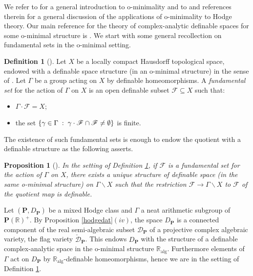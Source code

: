 \documentclass[10pt]{article}
\numberwithin{equation}{subsection}
\theoremstyle{plain}
\newtheorem{proposition}[theorem]{Proposition}
\theoremstyle{definition}
\newtheorem{definition}[theorem]{Definition}
\theoremstyle{remark}
\newcommand{\alg}{\mathbb{R}_\mathrm{alg}}
\newcommand{\R}{\mathbb R}
\newcommand{\pp}{\mathbf P}
\newcommand{\quo}{\backslash}
\begin{document}
We refer to \cite{vdd} for a general introduction to o-minimality and to \cite{klingicm} and references therein for a general discussion of the applications of o-minimality to Hodge theory. Our main reference for the theory of complex-analytic definable spaces for some o-minimal structure is \cite{bbt}. We start with some general recollection on fundamental sets in the o-minimal setting.
\begin{definition}[{\cite[Def. 2.1]{bbkt}}]\label{fundset}
Let $X$ be a locally compact Hausdorff topological space, endowed with a definable space structure (in an o-minimal structure) in the sense of \cite[Chap. 10, (1.2)]{vdd}. Let $\Gamma$ be a group acting on $X$ by definable homeomorphisms. A \textit{fundamental set} for the action of $\Gamma$ on $X$ is an open definable subset $\mathscr{F} \subseteq X$ such that:
\begin{itemize}
\item[(a)] $\Gamma \cdot \mathscr{F} = X$;
\item[(b)] the set $\{\gamma \in \Gamma \hspace{0.1cm} : \hspace{0.1cm} \gamma \cdot \mathscr{F} \cap \mathscr{F} \neq \emptyset\}$ is finite.
\end{itemize}
\end{definition}
The existence of such fundamental sets is enough to endow the quotient with a definable structure as the following asserts.
\begin{proposition}[{\cite[Prop. 2.3]{bbkt}}]\label{ominfund}
In the setting of Definition \ref{fundset}, if $\mathscr{F}$ is a fundamental set for the action of $\Gamma$ on $X$, there exists a unique structure of definable space (in the same o-minimal structure) on $\Gamma \quo X$ such that the restriction $\mathscr{F} \rightarrow \Gamma \quo X$ to $\mathscr{F}$ of the quotient map is definable.
\end{proposition}
Let $(\pp, D_\pp)$ be a mixed Hodge class and $\Gamma$ a neat arithmetic subgroup of $\pp(\R)^+$. By Proposition \ref{hodgedat}$(iv)$, the space $D_\pp$ is a connected component of the real semi-algebraic subset $\mathcal{D}_\pp$ of a projective complex algebraic variety, the flag variety $\check{\mathcal{D}}_\pp$. This endows $D_\pp$ with the structure of a definable complex-analytic space in the o-minimal structure $\alg$. Furthermore elements of $\Gamma$ act on $D_\pp$ by $\alg$-definable homeomorphisms, hence we are in the setting of Definition \ref{fundset}.
\end{document}

